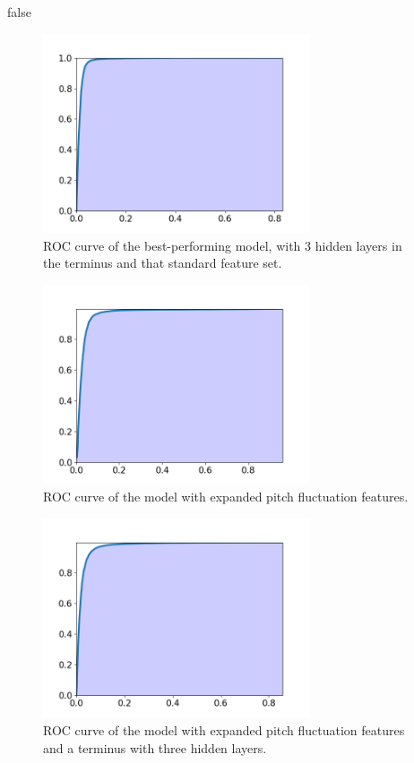 \documentclass{article}
\begin{document}
\if false
		\begin{figure}[htbp]
			\centering
			\includegraphics[width=0.7\textwidth]{images/roc_cterm.png}
			\caption{ROC curve of the best-performing model, with 3 hidden layers in the terminus
			and that standard feature set.}
			\label{fig:roc_cterm}
		\end{figure}
		\begin{figure}[htbp]
			\centering
			\includegraphics[width=0.7\textwidth]{images/roc_mpf.png}
			\caption{ROC curve of the model with expanded pitch fluctuation features.}
			\label{fig:roc_mpf}
		\end{figure}
		\begin{figure}[htbp]
			\centering
			\includegraphics[width=0.7\textwidth]{images/roc_mpf_cterm.png}
			\caption{ROC curve of the model with expanded pitch fluctuation features and a
			terminus with three hidden layers.}
			\label{fig:roc_mpf_cterm}
		\end{figure}
\fi 
\end{document}
